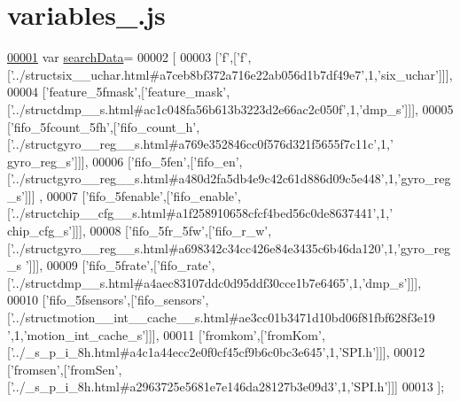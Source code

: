 \hypertarget{variables__6_8js_source}{}\section{variables\+\_.\+js}
\label{variables__6_8js_source}

\begin{DoxyCode}
\hypertarget{variables__6_8js_source.tex_l00001}{}\hyperlink{variables__6_8js_ad01a7523f103d6242ef9b0451861231e}{00001} var \hyperlink{variables__6_8js_ad01a7523f103d6242ef9b0451861231e}{searchData}=
00002 [
00003   [\textcolor{charliteral}{'f'},[\textcolor{charliteral}{'f'},[\textcolor{stringliteral}{'../structsix\_\_uchar.html#a7ceb8bf372a716e22ab056d1b7df49e7'},1,\textcolor{stringliteral}{'six\_uchar'}]]],
00004   [\textcolor{stringliteral}{'feature\_5fmask'},[\textcolor{stringliteral}{'feature\_mask'},[\textcolor{stringliteral}{'../structdmp\_\_s.html#ac1c048fa56b613b3223d2e66ac2c050f'},1,\textcolor{stringliteral}{'dmp\_s'}]]],
00005   [\textcolor{stringliteral}{'fifo\_5fcount\_5fh'},[\textcolor{stringliteral}{'fifo\_count\_h'},[\textcolor{stringliteral}{'../structgyro\_\_reg\_\_s.html#a769e352846cc0f576d321f5655f7c11c'},1,\textcolor{stringliteral}{'
      gyro\_reg\_s'}]]],
00006   [\textcolor{stringliteral}{'fifo\_5fen'},[\textcolor{stringliteral}{'fifo\_en'},[\textcolor{stringliteral}{'../structgyro\_\_reg\_\_s.html#a480d2fa5db4e9c42c61d886d09c5e448'},1,\textcolor{stringliteral}{'gyro\_reg\_s'}]]]
      ,
00007   [\textcolor{stringliteral}{'fifo\_5fenable'},[\textcolor{stringliteral}{'fifo\_enable'},[\textcolor{stringliteral}{'../structchip\_\_cfg\_\_s.html#a1f258910658cfcf4bed56c0de8637441'},1,\textcolor{stringliteral}{'
      chip\_cfg\_s'}]]],
00008   [\textcolor{stringliteral}{'fifo\_5fr\_5fw'},[\textcolor{stringliteral}{'fifo\_r\_w'},[\textcolor{stringliteral}{'../structgyro\_\_reg\_\_s.html#a698342c34cc426e84e3435c6b46da120'},1,\textcolor{stringliteral}{'gyro\_reg\_s
      '}]]],
00009   [\textcolor{stringliteral}{'fifo\_5frate'},[\textcolor{stringliteral}{'fifo\_rate'},[\textcolor{stringliteral}{'../structdmp\_\_s.html#a4aec83107ddc0d95ddf30cce1b7e6465'},1,\textcolor{stringliteral}{'dmp\_s'}]]],
00010   [\textcolor{stringliteral}{'fifo\_5fsensors'},[\textcolor{stringliteral}{'fifo\_sensors'},[\textcolor{stringliteral}{'../structmotion\_\_int\_\_cache\_\_s.html#ae3cc01b3471d10bd06f81fbf628f3e19
      '},1,\textcolor{stringliteral}{'motion\_int\_cache\_s'}]]],
00011   [\textcolor{stringliteral}{'fromkom'},[\textcolor{stringliteral}{'fromKom'},[\textcolor{stringliteral}{'../\_s\_p\_i\_8h.html#a4c1a44ecc2e0f0cf45cf9b6c0bc3e645'},1,\textcolor{stringliteral}{'SPI.h'}]]],
00012   [\textcolor{stringliteral}{'fromsen'},[\textcolor{stringliteral}{'fromSen'},[\textcolor{stringliteral}{'../\_s\_p\_i\_8h.html#a2963725e5681e7e146da28127b3e09d3'},1,\textcolor{stringliteral}{'SPI.h'}]]]
00013 ];
\end{DoxyCode}
